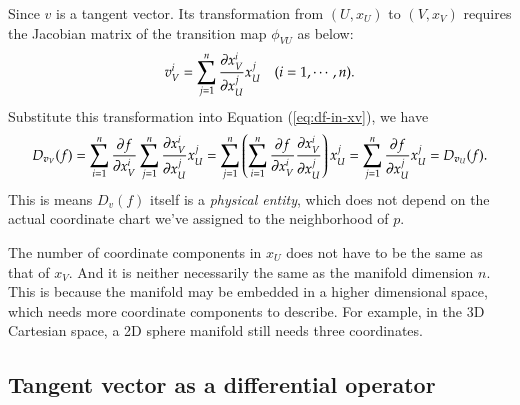 \documentclass[11pt, a4paper]{book}
\begin{document}
\begin{Proof}
  Since $v$ is a tangent vector. Its transformation from $(U,x_U)$ to $(V,x_V)$ requires
  the Jacobian matrix of the transition map $\phi_{VU}$ as below:
  \begin{equation}
    \label{eq:tangent-vector-transform}
    v_V^i = \sum_{j=1}^n \frac{\partial x_{V}^i}{\partial x_{U}^j} x_U^j \quad (i=1,\cdots,n).
  \end{equation}
  Substitute this transformation into Equation (\ref{eq:df-in-xv}), we have
  $$
  D_{\boldsymbol{v}_V}(f) = \sum_{i=1}^n \frac{\partial f}{\partial x_V^i} \sum_{j=1}^n \frac{\partial
    x_{V}^i}{\partial x_{U}^j} x_U^j = \sum_{j=1}^n \left( \sum_{i=1}^n \frac{\partial f}{\partial
      x_V^i} \frac{\partial x_{V}^i}{\partial x_{U}^j} \right) x_U^j = \sum_{j=1}^n \frac{\partial
    f}{\partial x_U^j} x_U^j = D_{\boldsymbol{v}_U}(f).
  $$
  This is means $D_v(f)$ itself is a \emph{physical entity}, which does not depend on the
  actual coordinate chart we've assigned to the neighborhood of $p$.
\end{Proof}

\begin{Remark}
  The number of coordinate components in $x_U$ does not have to be the same as that of
  $x_V$. And it is neither necessarily the same as the manifold dimension $n$. This is
  because the manifold may be embedded in a higher dimensional space, which needs more
  coordinate components to describe. For example, in the 3D Cartesian space, a 2D sphere
  manifold still needs three coordinates.
\end{Remark}

\subsection{Tangent vector as a differential operator}
\end{document}
